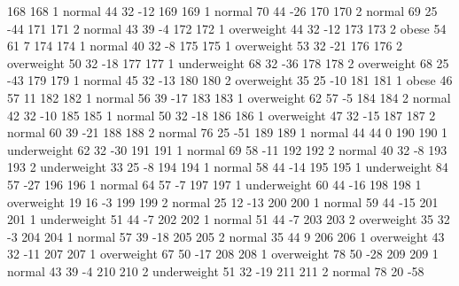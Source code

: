 \begin{Schunk}
\begin{Soutput}
168         168   1      normal  44         32          -12
169         169   1      normal  70         44          -26
170         170   2      normal  69         25          -44
171         171   2      normal  43         39           -4
172         172   1  overweight  44         32          -12
173         173   2       obese  54         61            7
174         174   1      normal  40         32           -8
175         175   1  overweight  53         32          -21
176         176   2  overweight  50         32          -18
177         177   1 underweight  68         32          -36
178         178   2  overweight  68         25          -43
179         179   1      normal  45         32          -13
180         180   2  overweight  35         25          -10
181         181   1       obese  46         57           11
182         182   1      normal  56         39          -17
183         183   1  overweight  62         57           -5
184         184   2      normal  42         32          -10
185         185   1      normal  50         32          -18
186         186   1  overweight  47         32          -15
187         187   2      normal  60         39          -21
188         188   2      normal  76         25          -51
189         189   1      normal  44         44            0
190         190   1 underweight  62         32          -30
191         191   1      normal  69         58          -11
192         192   2      normal  40         32           -8
193         193   2 underweight  33         25           -8
194         194   1      normal  58         44          -14
195         195   1 underweight  84         57          -27
196         196   1      normal  64         57           -7
197         197   1 underweight  60         44          -16
198         198   1  overweight  19         16           -3
199         199   2      normal  25         12          -13
200         200   1      normal  59         44          -15
201         201   1 underweight  51         44           -7
202         202   1      normal  51         44           -7
203         203   2  overweight  35         32           -3
204         204   1      normal  57         39          -18
205         205   2      normal  35         44            9
206         206   1  overweight  43         32          -11
207         207   1  overweight  67         50          -17
208         208   1  overweight  78         50          -28
209         209   1      normal  43         39           -4
210         210   2 underweight  51         32          -19
211         211   2      normal  78         20          -58

\end{Soutput}
\end{Schunk}
